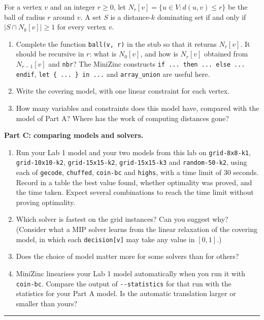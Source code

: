 \documentclass[11pt]{article}
\begin{document}
For a vertex $v$ and an integer $r \ge 0$, let $N_r[v] = \{u \in V : d(u, v) \le r\}$ be the ball of radius $r$ around $v$. A set $S$ is a distance-$k$ dominating set if and only if $|S \cap N_k[v]| \ge 1$ for every vertex $v$.

\begin{enumerate}
\item Complete the function \mbox{\texttt{ball(v, r)}} in the stub so that it returns $N_r[v]$. It should be recursive in $r$: what is $N_0[v]$, and how is $N_r[v]$ obtained from $N_{r-1}[v]$ and \mbox{\texttt{nbr}}? The MiniZinc constructs \texttt{if ... then ... else ... endif}, \mbox{\texttt{let \{ ... \} in ...}} and \mbox{\texttt{array\_union}} are useful here.
\item Write the covering model, with one linear constraint for each vertex.
\item How many variables and constraints does this model have, compared with the model of Part A? Where has the work of computing distances gone?
\end{enumerate}
\textbf{Part C: comparing models and solvers.}

\begin{enumerate}
\item Run your Lab 1 model and your two models from this lab on \mbox{\texttt{grid-{}8x8-{}k1}}, \mbox{\texttt{grid-{}10x10-{}k2}}, \mbox{\texttt{grid-{}15x15-{}k2}}, \mbox{\texttt{grid-{}15x15-{}k3}} and \mbox{\texttt{random-{}50-{}k2}}, using each of \mbox{\texttt{gecode}}, \mbox{\texttt{chuffed}}, \mbox{\texttt{coin-{}bc}} and \mbox{\texttt{highs}}, with a time limit of 30 seconds. Record in a table the best value found, whether optimality was proved, and the time taken. Expect several combinations to reach the time limit without proving optimality.
\item Which solver is fastest on the grid instances? Can you suggest why? (Consider what a MIP solver learns from the linear relaxation of the covering model, in which each \mbox{\texttt{decision[v]}} may take any value in $[0, 1]$.)
\item Does the choice of model matter more for some solvers than for others?
\item MiniZinc linearises your Lab 1 model automatically when you run it with \mbox{\texttt{coin-{}bc}}. Compare the output of \mbox{\texttt{-{}-{}statistics}} for that run with the statistics for your Part A model. Is the automatic translation larger or smaller than yours?
\end{enumerate}
\bigskip\hrule\bigskip
\end{document}
